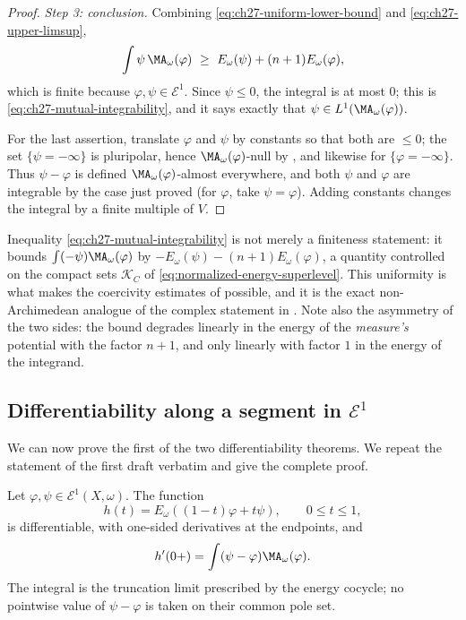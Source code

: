 \begin{proof}
\emph{Step 3: conclusion.}
Combining \eqref{eq:ch27-uniform-lower-bound} and
\eqref{eq:ch27-upper-limsup},
\[
 \int\psi\,\MA_\omega(\varphi)\ \geq\ E_\omega(\psi)+(n+1)E_\omega(\varphi),
\]
which is finite because \(\varphi,\psi\in\mathcal E^1\).  Since
\(\psi\leq0\), the integral is at most \(0\); this is
\eqref{eq:ch27-mutual-integrability}, and it says exactly that
\(\psi\in L^1(\MA_\omega(\varphi))\).

For the last assertion, translate \(\varphi\) and \(\psi\) by constants so
that both are \(\leq0\); the set \(\{\psi=-\infty\}\) is pluripolar, hence
\(\MA_\omega(\varphi)\)-null by , and likewise
for \(\{\varphi=-\infty\}\).  Thus \(\psi-\varphi\) is defined
\(\MA_\omega(\varphi)\)-almost everywhere, and both \(\psi\) and
\(\varphi\) are integrable by the case just proved (for \(\varphi\), take
\(\psi=\varphi\)).  Adding constants changes the integral by a finite
multiple of \(V\).
\end{proof}

\begin{remark}
\label{rem:ch27-mutual-quantitative}
Inequality \eqref{eq:ch27-mutual-integrability} is not merely a finiteness
statement: it bounds \(\int(-\psi)\MA_\omega(\varphi)\) by
\(-E_\omega(\psi)-(n+1)E_\omega(\varphi)\), a quantity controlled on the
compact sets \(\mathcal K_C\) of \eqref{eq:normalized-energy-superlevel}.
This uniformity is what makes the coercivity estimates of
 possible, and it is the exact
non-Archimedean analogue of the complex statement in
\cite[\S2]{BBGZ13}.  Note also the asymmetry of the two sides: the bound
degrades linearly in the energy of the \emph{measure's} potential with the
factor \(n+1\), and only linearly with factor \(1\) in the energy of the
integrand.
\end{remark}

\subsection{Differentiability along a segment in
\texorpdfstring{\(\mathcal E^1\)}{E1}}
\label{sec:ch27-e1-segment}

We can now prove the first of the two differentiability theorems.  We repeat
the statement of the first draft verbatim and give the complete proof.

\begin{theorem}\label{thm:e1-energy-differentiability}
Let \(\varphi,\psi\in\mathcal E^1(X,\omega)\). The function
\[
              h(t)=E_\omega((1-t)\varphi+t\psi),
              \qquad 0\leq t\leq1,
\]
is differentiable, with one-sided derivatives at the endpoints, and
\begin{equation}\label{eq:e1-energy-derivative}
 h'(0+)=\int(\psi-\varphi)\MA_\omega(\varphi).
\end{equation}
The integral is the truncation limit prescribed by the energy cocycle; no
pointwise value of \(\psi-\varphi\) is taken on their common pole set.
\end{theorem}

